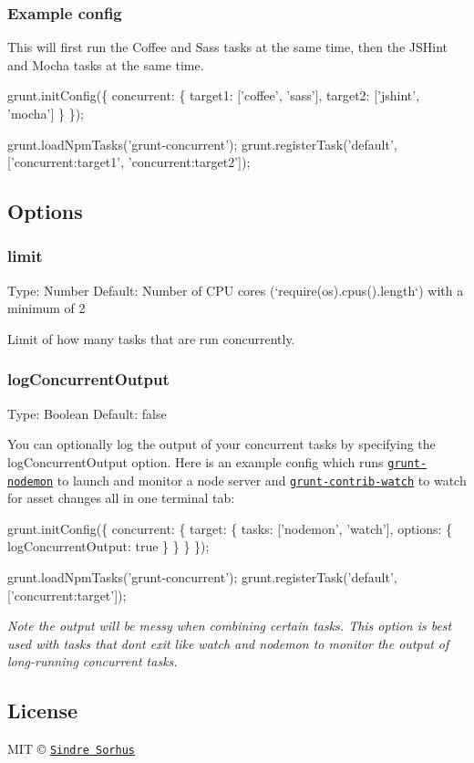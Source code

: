 \subsubsection*{Example config}

This will first run the Coffee and Sass tasks at the same time, then the J\+S\+Hint and Mocha tasks at the same time.


\begin{DoxyCode}
grunt.initConfig(\{
    concurrent: \{
        target1: ['coffee', 'sass'],
        target2: ['jshint', 'mocha']
    \}
\});

grunt.loadNpmTasks('grunt-concurrent');
grunt.registerTask('default', ['concurrent:target1', 'concurrent:target2']);
\end{DoxyCode}


\subsection*{Options}

\subsubsection*{limit}

Type\+: {\ttfamily Number} Default\+: Number of C\+PU cores (`require(\textquotesingle{}os\textquotesingle{}).cpus().length`) with a minimum of 2

Limit of how many tasks that are run concurrently.

\subsubsection*{log\+Concurrent\+Output}

Type\+: {\ttfamily Boolean} Default\+: {\ttfamily false}

You can optionally log the output of your concurrent tasks by specifying the {\ttfamily log\+Concurrent\+Output} option. Here is an example config which runs \href{https://github.com/ChrisWren/grunt-nodemon}{\tt grunt-\/nodemon} to launch and monitor a node server and \href{https://github.com/gruntjs/grunt-contrib-watch}{\tt grunt-\/contrib-\/watch} to watch for asset changes all in one terminal tab\+:


\begin{DoxyCode}
grunt.initConfig(\{
    concurrent: \{
        target: \{
            tasks: ['nodemon', 'watch'],
            options: \{
                logConcurrentOutput: true
            \}
        \}
    \}
\});

grunt.loadNpmTasks('grunt-concurrent');
grunt.registerTask('default', ['concurrent:target']);
\end{DoxyCode}


{\itshape Note the output will be messy when combining certain tasks. This option is best used with tasks that don\textquotesingle{}t exit like watch and nodemon to monitor the output of long-\/running concurrent tasks.}

\subsection*{License}

M\+IT © \href{http://sindresorhus.com}{\tt Sindre Sorhus} 